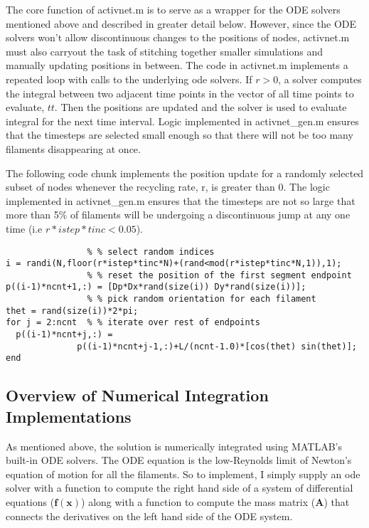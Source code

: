 The core function of activnet.m is to serve as a wrapper for the ODE solvers mentioned above and described in greater detail below.  However, since the ODE solvers won't allow discontinuous changes to the positions of nodes, activnet.m must also carryout the task of stitching together smaller simulations and manually updating positions in between.  The code in activnet.m implements a repeated loop with calls to the underlying ode solvers. If $r>0$, a solver computes the integral between two adjacent time points in the vector of all time points to evaluate, $tt$. Then the positions are updated and the solver is used to evaluate integral for the next time interval. Logic implemented in activnet\_gen.m ensures that the timesteps are selected small enough so that there will not be too many filaments disappearing at once.

The following code chunk implements the position update for a randomly selected subset of nodes whenever the recycling rate, r, is greater than 0.  The logic implemented in activnet\_gen.m ensures that the timesteps are not so large that more than 5\% of filaments will be undergoing a discontinuous jump at any one time (i.e $r*istep*tinc <0.05$).

\begin{verbatim}
				% % select random indices
i = randi(N,floor(r*istep*tinc*N)+(rand<mod(r*istep*tinc*N,1)),1); 
				% % reset the position of the first segment endpoint
p((i-1)*ncnt+1,:) = [Dp*Dx*rand(size(i)) Dy*rand(size(i))];
				% % pick random orientation for each filament
thet = rand(size(i))*2*pi;
for j = 2:ncnt  % % iterate over rest of endpoints
  p((i-1)*ncnt+j,:) = 
			  p((i-1)*ncnt+j-1,:)+L/(ncnt-1.0)*[cos(thet) sin(thet)];
end

\end{verbatim}


\subsection{Overview of Numerical Integration Implementations}
As mentioned above, the solution is numerically integrated using MATLAB's built-in ODE solvers.  The ODE equation is the low-Reynolds limit of Newton's equation of motion for all the filaments.  So to implement, I simply supply an ode solver with a function to compute the right hand side of a system of differential equations ($\mathbf{f(x)}$) along with a function to compute the mass matrix ($\mathbf{A}$) that connects the derivatives on the left hand side of the ODE system.

